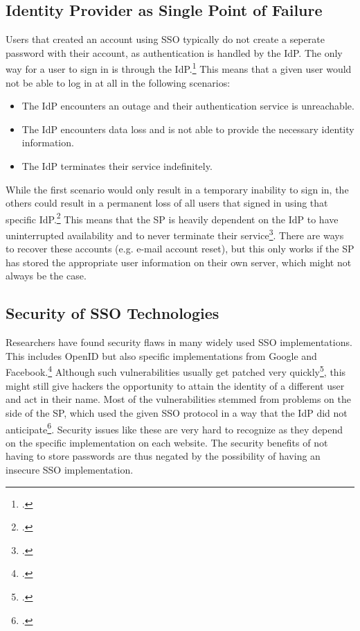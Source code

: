 \subsection{Identity Provider as Single Point of Failure}

Users that created an account using \ac{SSO} typically do not create a seperate password with their account,
as authentication is handled by the \ac{IdP}. The only way for a user to sign in is through the \ac{IdP}.\footcite[Cp.][p. 24]{Bazaz2016}
This means that a given user would not be able to log in at all in the following scenarios:

\begin{itemize}
    \item The \ac{IdP} encounters an outage and their authentication service is unreachable.
    \item The \ac{IdP} encounters data loss and is not able to provide the necessary identity information.
    \item The \ac{IdP} terminates their service indefinitely.
\end{itemize}

While the first scenario would only result in a temporary inability to sign in, the others could result
in a permanent loss of all users that signed in using that specific \ac{IdP}.\footcite[Cp.][p. 22]{Bazaz2016}
This means that the \ac{SP} is heavily dependent on the \ac{IdP} to have uninterrupted availability and to never terminate
their service\footcite[Cp.][p. 62]{Sun2010}.
There are ways to recover these accounts (e.g. e-mail account reset), but this only works if the \ac{SP} has stored
the appropriate user information on their own server, which might not always be the case.

\subsection{Security of SSO Technologies}

Researchers have found security flaws in many widely used \ac{SSO} implementations.
This includes OpenID but also specific implementations from Google and Facebook.\footcite[Cp.][p. 376]{Wang2012}
Although such vulnerabilities usually get patched very quickly\footcite[Cp.][p. 370-375]{Wang2012}, this might still give hackers the
opportunity to attain the identity of a different user and act in their name.
Most of the vulnerabilities stemmed from problems on the side of the \ac{SP},
which used the given \ac{SSO} protocol in a way that the \ac{IdP} did not anticipate\footcite[Cp.][p. 376]{Wang2012}.
Security issues like these are very hard to recognize as they depend on the 
specific implementation on each website.
The security benefits of not having to store passwords are thus negated by the possibility
of having an insecure \ac{SSO} implementation.

